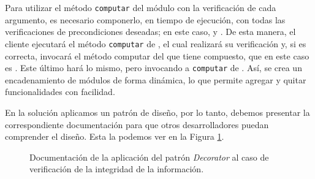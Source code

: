 Para utilizar el método \verb|computar| del módulo \MecanismoConcreto con la verificación de cada argumento, es necesario componerlo, en tiempo de ejecución, con todas las verificaciones de precondiciones deseadas; en este caso, \PrimerArgPositivo y \SegundoArgPar. De esta manera, el cliente ejecutará el método \verb|computar| de \PrimerArgPositivo, el cual realizará su verificación y, si es correcta, invocará el método computar del \Mecanismo que tiene compuesto, que en este caso es \SegundoArgPar. Este último hará lo mismo, pero invocando a \verb|computar| de \MecanismoConcreto. Así, se crea un encadenamiento de módulos de forma dinámica, lo que permite agregar y quitar funcionalidades con facilidad.

En la solución aplicamos un patrón de diseño, por lo tanto, debemos presentar la correspondiente documentación para que otros desarrolladores puedan comprender el diseño. Esta la podemos ver en la Figura \ref{docDecorator}.

\begin{figure}[H]
\caption{Documentación de la aplicación del patrón \textit{Decorator} al caso de verificación de la integridad de la información.}
\label{docDecorator}
\end{figure}

